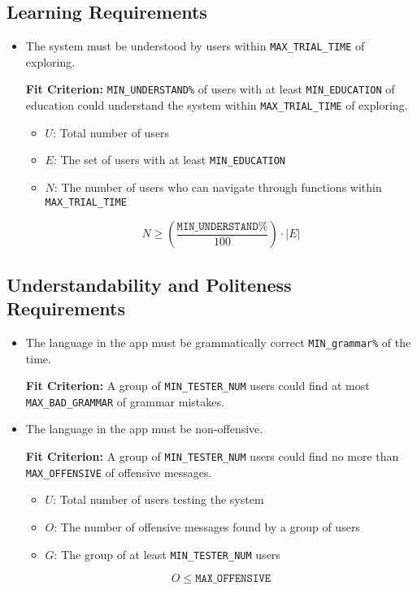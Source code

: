\documentclass[12pt]{article}
\newcounter{nfrnum} %
\newcommand{\rthenfrnum}{NFR\refstepcounter{nfrnum}\thenfrnum:}
\begin{document}
\subsection{Learning Requirements}
\begin{itemize}
\item[\rthenfrnum]
The system must be understood by users within \texttt{MAX\_TRIAL\_TIME} of exploring.

\textbf{Fit Criterion:} \texttt{MIN\_UNDERSTAND\%} of users with at least \texttt{MIN\_EDUCATION} of education could understand the system within \texttt{MAX\_TRIAL\_TIME} of exploring.
\begin{itemize}
    \item \( U \): Total number of users
    \item \( E \): The set of users with at least \texttt{MIN\_EDUCATION}
    \item \( N \): The number of users who can navigate through functions within \texttt{MAX\_TRIAL\_TIME}
\end{itemize}

\[
    N \geq \left( \frac{\texttt{MIN\_UNDERSTAND\%}}{100} \right) \cdot |E|
\]
\end{itemize}
\subsection{Understandability and Politeness Requirements}
\begin{itemize}
\item[\rthenfrnum]
The language in the app must be grammatically correct \texttt{MIN\_grammar\%} of the time.

\textbf{Fit Criterion:} A group of \texttt{MIN\_TESTER\_NUM}  users could find at most \texttt{MAX\_BAD\_GRAMMAR} of grammar mistakes.

\item[\rthenfrnum]
The language in the app must be non-offensive.

\textbf{Fit Criterion:} A group of \texttt{MIN\_TESTER\_NUM} users could find no more than \texttt{MAX\_OFFENSIVE} of offensive messages.
\begin{itemize}
    \item \( U \): Total number of users testing the system
    \item \( O \): The number of offensive messages found by a group of users
    \item \( G \): The group of at least \texttt{MIN\_TESTER\_NUM} users
\end{itemize}
\[
    O \leq \texttt{MAX\_OFFENSIVE}
\]
\end{itemize}
\end{document}
